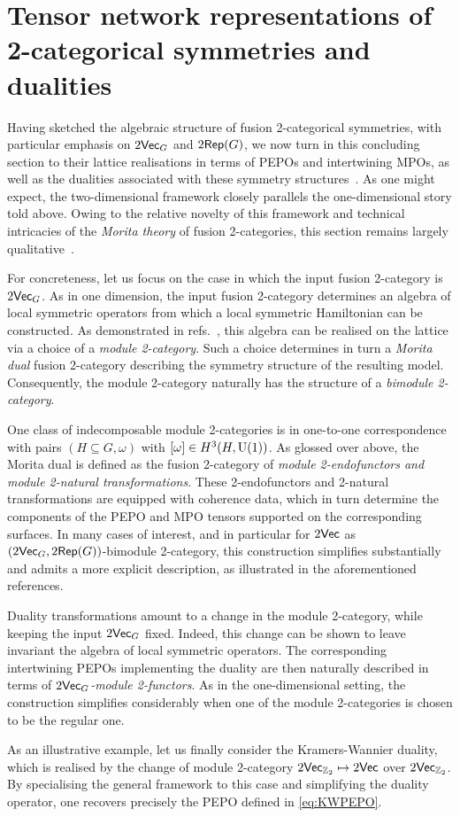\section{Tensor network representations of 2-categorical symmetries and dualities}\label{eq:2dDualities}
Having sketched the algebraic structure of fusion 2-categorical symmetries, with particular emphasis on $2\mathsf{Vec}_G$ and $2\mathsf{Rep}(G)$, we now turn in this concluding section to their lattice realisations in terms of PEPOs and intertwining MPOs, as well as the dualities associated with these symmetry structures~\cite{Haegeman2014a,Delcamp2021,Delcamp2023,Vancraeynest2025a}. As one might expect, the two-dimensional framework closely parallels the one-dimensional story told above. Owing to the relative novelty of this framework and technical intricacies of the \emph{Morita theory} of fusion 2-categories, this section remains largely qualitative~\cite{Decoppet2023b}.

For concreteness, let us focus on the case in which the input fusion 2-category is $2\mathsf{Vec}_G$. As in one dimension, the input fusion 2-category determines an algebra of local symmetric operators from which a local symmetric Hamiltonian can be constructed. As demonstrated in refs.~\cite{Delcamp2021,Delcamp2023}, this algebra can be realised on the lattice via a choice of a \emph{module 2-category}. Such a choice determines in turn a \emph{Morita dual} fusion 2-category describing the symmetry structure of the resulting model. Consequently, the module 2-category naturally has the structure of a \emph{bimodule 2-category}.

One class of indecomposable module 2-categories is in one-to-one correspondence with pairs $(H\subseteq G,\omega)$ with $[\omega]\in H^3(H,{\rm U}(1))$. As glossed over above, the Morita dual is defined as the fusion 2-category of \emph{module 2-endofunctors and module 2-natural transformations}. These 2-endofunctors and 2-natural transformations are equipped with coherence data, which in turn determine the components of the PEPO and MPO tensors supported on the corresponding surfaces. In many cases of interest, and in particular for $2\mathsf{Vec}$ as $(2\mathsf{Vec}_G,2\mathsf{Rep}(G))$-bimodule 2-category, this construction simplifies substantially and admits a more explicit description, as illustrated in the aforementioned references.

Duality transformations amount to a change in the module 2-category, while keeping the input $2\mathsf{Vec}_G$ fixed. Indeed, this change can be shown to leave invariant the algebra of local symmetric operators. The corresponding intertwining PEPOs implementing the duality are then naturally described in terms of \emph{$2\mathsf{Vec}_G$-module 2-functors}. As in the one-dimensional setting, the construction simplifies considerably when one of the module 2-categories is chosen to be the regular one.

As an illustrative example, let us finally consider the Kramers-Wannier duality, which is realised by the change of module 2-category $2\mathsf{Vec}_{\mathbb Z_2}\mapsto2\mathsf{Vec}$ over $2\mathsf{Vec}_{\mathbb Z_2}$. By specialising the general framework to this case and simplifying the duality operator, one recovers precisely the PEPO defined in \cref{eq:KWPEPO}.
